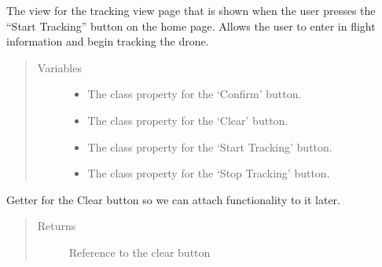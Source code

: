 \documentclass[letterpaper,10pt,english]{sphinxmanual}
\begin{document}
\begin{fulllineitems}
\label{\detokenize{index:src.Views.View_TrackingScreen.TrackingWindow}}
The view for the tracking view page that is shown when the user presses the “Start Tracking” button on the home page.
Allows the user to enter in flight information and begin tracking the drone.
\begin{quote}\begin{description}
\item[{Variables}] \leavevmode\begin{itemize}
\item {} 
 \textendash{} The class property for the ‘Confirm’ button.

\item {} 
 \textendash{} The class property for the ‘Clear’ button.

\item {} 
 \textendash{} The class property for the ‘Start Tracking’ button.

\item {} 
 \textendash{} The class property for the ‘Stop Tracking’ button.

\end{itemize}

\end{description}\end{quote}

\begin{fulllineitems}
\label{\detokenize{index:src.Views.View_TrackingScreen.TrackingWindow.BtnClear}}
Getter for the Clear button so we can attach functionality to it later.
\begin{quote}\begin{description}
\item[{Returns}] \leavevmode
Reference to the clear button


\end{description}
\end{quote}
\end{fulllineitems}
\end{fulllineitems}
\end{document}
